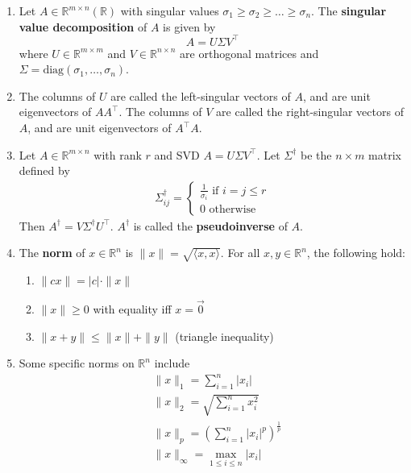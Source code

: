 \documentclass[10pt]{article}
\begin{document}
\begin{multicols}{2}
\begin{addmargin}[0.8em]{0.5em}
\begin{enumerate}[label=(\alph*)]
        \item Let $A \in \mathbb{R}^{m \times n}(\mathbb{R})$ with singular values $\sigma_1 \geq \sigma_2 \geq \hdots \geq \sigma_n$. The \textbf{singular value decomposition} of $A$ is given by 
        $$
        A = U \Sigma V^\top 
        $$
        where $U \in \mathbb{R}^{m \times m}$ and $V \in \mathbb{R}^{n \times n}$ are orthogonal matrices and $\Sigma=\text{diag}(\sigma_1, \hdots, \sigma_n)$.
        \item The columns of $U$ are called the left-singular vectors of $A$, and are unit eigenvectors of $AA^\top$. The columns of $V$ are called the right-singular vectors of $A$, and are unit eigenvectors of $A^\top A$.
        \item Let $A \in \mathbb{R}^{m \times n}$ with rank $r$ and SVD $A=U\Sigma V^\top$. Let $\Sigma^\dagger$ be the $n \times m$ matrix defined by
        \begin{align*}
            \Sigma_{ij}^\dagger = 
                \left\{
                \begin{array}{ll}
                  \frac{1}{\sigma_i} \text{ if $i=j \leq r$} \\
                  0 \text{ otherwise}
                \end{array}
                \right.
        \end{align*}
        Then $A^\dagger = V \Sigma^\dagger U^\top$. $A^\dagger$ is called the \textbf{pseudoinverse} of $A$.

        \item The \textbf{norm} of $x \in \mathbb{R}^n$ is $\| x \| = \sqrt{ \langle x,x \rangle }$. For all $x,y \in \mathbb{R}^n$, the following hold:
        \begin{enumerate}
            \item $\| cx \| = |c| \cdot \| x \|$
            \item $\| x \| \geq 0$ with equality iff $x=\vec{0}$
            \item $\| x + y \| \leq \| x \| + \| y \|$ (triangle inequality)
        \end{enumerate}
        
        \item Some specific norms on $\mathbb{R}^n$ include
        \begin{align*}
            &\| x \|_1 = \sum_{i=1}^n | x_i | \\
            &\| x \|_2 = \sqrt{\sum_{i=1}^n  x_i^2 } \\
            &\| x \|_p = \left( \sum_{i=1}^n  |x_i|^p  \right)^\frac{1}{p} \\
            &\| x \|_\infty = \max_{1 \leq i \leq n} |x_i|
        \end{align*}
        

\end{enumerate}
\end{addmargin}
\end{multicols}
\end{document}
